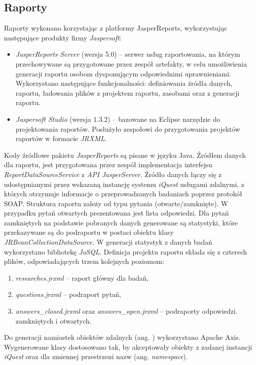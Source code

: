 \subsection{Raporty}
Raporty wykonano korzystając z platformy JasperReports, wykorzystując następujące produkty firmy \emph{Jaspersoft}:

\begin{itemize}
\item \emph{JasperReports Server} (wersja 5.0) -- serwer usług raportowania, na którym przechowywane są przygotowane przez zespół artefakty, w celu umożliwienia generacji raportu osobom dysponującym odpowiednimi uprawnieniami. Wykorzystano następujące funkcjonalności: definiowania źródła danych, raportu, ładowania plików z projektem raportu, zasobami oraz z generacji raportu.
\item \emph{Jaspersoft Studio} (wersja 1.3.2) -- bazowane na Eclipse narzędzie do projektowania raportów. Posłużyło zespołowi do przygotowania projektów raportów w formacie \emph{JRXML}.
\end{itemize}

Kody źródłowe pakietu \emph{JasperReports} są pisane w języku Java. Źródłem danych dla raportu, jest przygotowana przez zespół implementacja interfejsu \emph{ReportDataSourceService} z \emph{API JasperServer}. Źródło danych łączy się z udostępnianymi przez wskazaną instancję systemu \emph{iQuest} usługami zdalnymi, z których otrzymuje informacje o przeprowadzanych badaniach poprzez protokół SOAP. Struktura raportu zależy od typu pytania (otwarte/zamknięte). W przypadku pytań otwartych prezentowana jest lista odpowiedzi. Dla pytań zamkniętych na podstawie pobranych danych generowane są statystyki, które przekazywane są do podraportu w postaci obiektu klasy \emph{JRBeanCollectionDataSource}. W generacji statystyk z danych badań wykorzystano bibliotekę \emph{JoSQL}. Definicja projektu raportu składa się z czterech plików, odpowiadających trzem kolejnych poziomom:
\begin{enumerate}
\item \emph{researches.jrxml} -- raport główny dla badań,
\item \emph{questions.jrxml} -- podraport pytań,
\item \emph{answers\_closed.jrxml} oraz \emph{answers\_open.jrxml} -- podraporty odpowiedzi. zamkniętych i otwartych.
\end{enumerate}
Do generacji namiastek obiektów zdalnych (ang. ) wykorzystano Apache Axis. Wygenerowane klasy dostosowano tak, by akceptowały obiekty z zadanej instancji \emph{iQuest} oraz dla zmiennej przestrzeni nazw (ang. \emph{namespace}).\\

